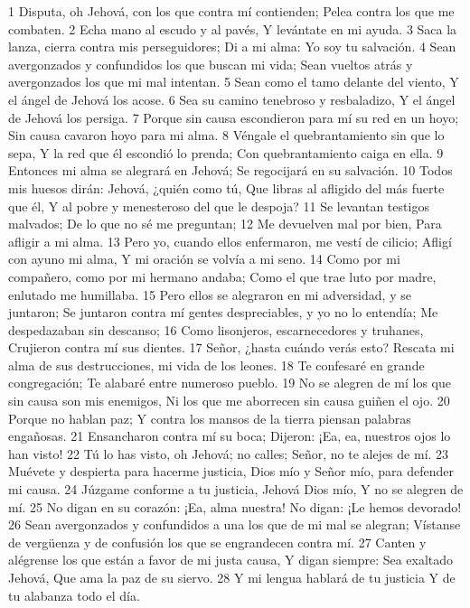 1 Disputa, oh Jehová, con los que contra mí contienden;
Pelea contra los que me combaten.
2 Echa mano al escudo y al pavés,
Y levántate en mi ayuda.
3 Saca la lanza, cierra contra mis perseguidores;
Di a mi alma: Yo soy tu salvación.
4 Sean avergonzados y confundidos los que buscan mi vida;
Sean vueltos atrás y avergonzados los que mi mal intentan.
5 Sean como el tamo delante del viento,
Y el ángel de Jehová los acose.
6 Sea su camino tenebroso y resbaladizo,
Y el ángel de Jehová los persiga.
7 Porque sin causa escondieron para mí su red en un hoyo;
Sin causa cavaron hoyo para mi alma.
8 Véngale el quebrantamiento sin que lo sepa,
Y la red que él escondió lo prenda;
Con quebrantamiento caiga en ella.
9 Entonces mi alma se alegrará en Jehová;
Se regocijará en su salvación.
10 Todos mis huesos dirán: Jehová, ¿quién como tú,
Que libras al afligido del más fuerte que él,
Y al pobre y menesteroso del que le despoja?
11 Se levantan testigos malvados;
De lo que no sé me preguntan;
12 Me devuelven mal por bien,
Para afligir a mi alma.
13 Pero yo, cuando ellos enfermaron, me vestí de cilicio;
Afligí con ayuno mi alma,
Y mi oración se volvía a mi seno.
14 Como por mi compañero, como por mi hermano andaba;
Como el que trae luto por madre, enlutado me humillaba.
15 Pero ellos se alegraron en mi adversidad, y se juntaron;
Se juntaron contra mí gentes despreciables, y yo no lo entendía;
Me despedazaban sin descanso;
16 Como lisonjeros, escarnecedores y truhanes,
Crujieron contra mí sus dientes.
17 Señor, ¿hasta cuándo verás esto?
Rescata mi alma de sus destrucciones, mi vida de los leones.
18 Te confesaré en grande congregación;
Te alabaré entre numeroso pueblo.
19 No se alegren de mí los que sin causa son mis enemigos,
Ni los que me aborrecen sin causa guiñen el ojo.
20 Porque no hablan paz;
Y contra los mansos de la tierra piensan palabras engañosas.
21 Ensancharon contra mí su boca;
Dijeron: ¡Ea, ea, nuestros ojos lo han visto!
22 Tú lo has visto, oh Jehová; no calles;
Señor, no te alejes de mí.
23 Muévete y despierta para hacerme justicia,
Dios mío y Señor mío, para defender mi causa.
24 Júzgame conforme a tu justicia, Jehová Dios mío,
Y no se alegren de mí.
25 No digan en su corazón: ¡Ea, alma nuestra!
No digan: ¡Le hemos devorado!
26 Sean avergonzados y confundidos a una los que de mi mal se alegran;
Vístanse de vergüenza y de confusión los que se engrandecen contra mí.
27 Canten y alégrense los que están a favor de mi justa causa,
Y digan siempre: Sea exaltado Jehová,
Que ama la paz de su siervo.
28 Y mi lengua hablará de tu justicia
Y de tu alabanza todo el día.

